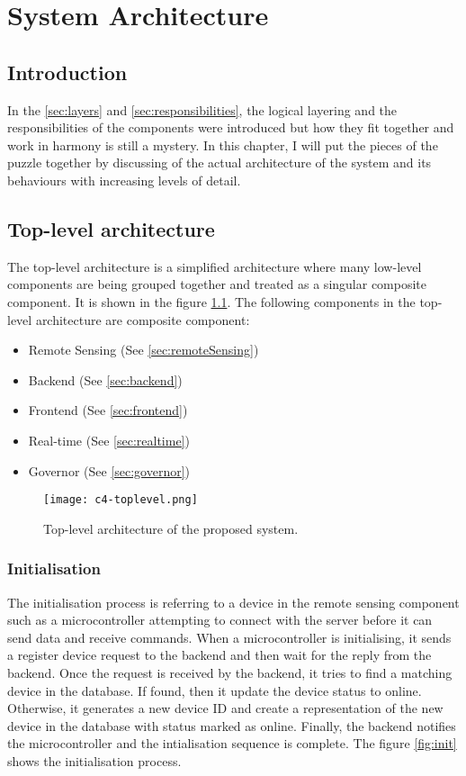 \documentclass[../thesis.tex]{subfiles}
\begin{document}
\chapter{System Architecture}

\section{Introduction}

In the \autoref{sec:layers} and \autoref{sec:responsibilities}, the logical layering and the responsibilities of the components were introduced but how they fit together and work in harmony is still a mystery. In this chapter, I will put the pieces of the puzzle together by discussing of the actual architecture of the system and its behaviours with increasing levels of detail. 


\section{Top-level architecture}

The top-level architecture is a simplified architecture where many low-level components are being grouped together and treated as a singular composite component. It is shown in the figure \ref{fig:toplevel}. The following components in the top-level architecture are composite component:

\begin{itemize}
	\item Remote Sensing (See \autoref{sec:remoteSensing})
	\item Backend (See \autoref{sec:backend})
	\item Frontend (See \autoref{sec:frontend})
	\item Real-time (See \autoref{sec:realtime})
	\item Governor (See \autoref{sec:governor})
\end{itemize}

\begin{figure}[!ht]
	\centering
	\texttt{[image: c4-toplevel.png]}
	\caption{Top-level architecture of the proposed system.}
	\label{fig:toplevel}
\end{figure}

\subsection{Initialisation}

The initialisation process is referring to a device in the remote sensing component such as a microcontroller attempting to connect with the server before it can send data and receive commands. When a microcontroller is initialising, it sends a register device request to the backend and then wait for the reply from the backend. Once the request is received by the backend, it tries to find a matching device in the database. If found, then it update the device status to online. Otherwise, it generates a new device ID and create a representation of the new device in the database with status marked as online. Finally, the backend notifies the microcontroller and the intialisation sequence is complete. The figure \ref{fig:init} shows the initialisation process.
\end{document}
